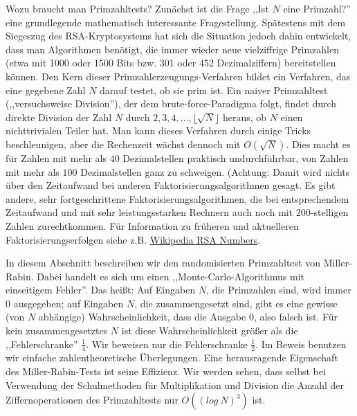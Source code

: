 \documentclass[a4paper]{article}
\begin{document}
\begin{multicols}{3}
        Wozu braucht man Primzahltests? Zunächst ist die Frage ,,Ist $N$ eine Primzahl?'' eine grundlegende mathematisch interessante Fragestellung. Spätestens mit dem Siegeszug des RSA-Kryptosystems hat sich die Situation jedoch dahin entwickelt, dass man Algorithmen benötigt, die immer wieder neue vielziffrige Primzahlen (etwa mit 1000 oder 1500 Bits bzw. 301 oder 452 Dezimalziffern) bereitstellen können. Den Kern dieser Primzahlerzeugungs-Verfahren bildet ein Verfahren, das eine gegebene Zahl $N$ darauf testet, ob sie prim ist. Ein naiver Primzahltest (,,versuchsweise Division''), der dem brute-force-Paradigma folgt, findet durch direkte Division der Zahl $N$ durch $2,3,4,...,\lfloor\sqrt{N}\rfloor$ heraus, ob $N$ einen nichttrivialen Teiler hat. Man kann dieses Verfahren durch einige Tricks beschleunigen, aber die Rechenzeit wächst dennoch mit $O(\sqrt{N})$. Dies macht es für Zahlen mit mehr als $40$ Dezimalstellen praktisch undurchführbar, von Zahlen mit mehr als $100$ Dezimalstellen ganz zu schweigen. (Achtung: Damit wird nichts über den Zeitaufwand bei anderen Faktorisierungsalgorithmen gesagt. Es gibt andere, sehr fortgeschrittene Faktorisierungsalgorithmen, die bei entsprechendem Zeitaufwand und mit sehr leistungsstarken Rechnern auch noch mit $200$-stelligen Zahlen zurechtkommen. Für Information zu früheren und aktuelleren Faktorisierungserfolgen siehe z.B. \href{http://en.wikipedia.org/wiki/RSA_numbers}{Wikipedia RSA Numbers}.

        In diesem Abschnitt beschreiben wir den randomisierten Primzahltest von Miller-Rabin. Dabei handelt es sich um einen ,,Monte-Carlo-Algorithmus mit einseitigem Fehler''. Das heißt: Auf Eingaben $N$, die Primzahlen sind, wird immer $0$ ausgegeben; auf Eingaben $N$, die zusammengesetzt sind, gibt es eine gewisse (von $N$ abhängige) Wahrscheinlichkeit, dass die Ausgabe $0$, also falsch ist. Für kein zusammengesetztes $N$ ist diese Wahrscheinlichkeit größer als die ,,Fehlerschranke'' $\frac{1}{4}$. Wir beweisen nur die Fehlerschranke $\frac{1}{2}$. Im Beweis benutzen wir einfache zahlentheoretische Überlegungen. Eine herausragende Eigenschaft des Miller-Rabin-Tests ist seine Effizienz. Wir werden sehen, dass selbst bei Verwendung der Schulmethoden für Multiplikation und Division die Anzahl der Ziffernoperationen des Primzahltests nur $O((log\ N)^3)$ ist.


\end{multicols}
\end{document}
